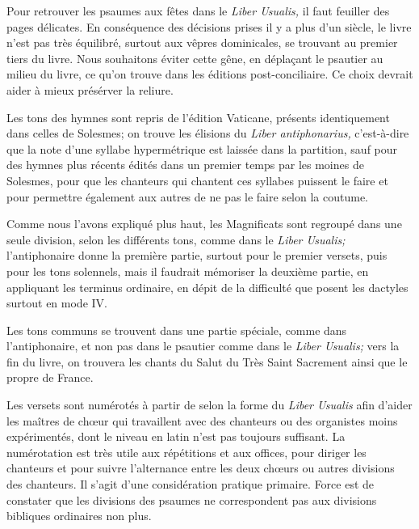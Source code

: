 \begin{frpars}
Pour retrouver les psaumes aux fêtes dans le \textit{Liber Usualis,} il faut feuiller des pages délicates. En conséquence des décisions prises il y a plus d'un siècle, le livre n'est pas très équilibré, surtout aux vêpres dominicales, se trouvant au premier tiers du livre. Nous souhaitons éviter cette gêne, en déplaçant le psautier au milieu du livre, ce qu'on trouve dans les éditions post-conciliaire. Ce choix devrait aider à mieux présérver la reliure.

Les tons des hymnes sont repris de l'édition Vaticane, présents identiquement dans celles de Solesmes; on trouve les élisions du \textit{Liber antiphonarius,} c’est-à-dire que la note d'une syllabe hypermétrique est laissée dans la partition, sauf pour des hymnes plus récents édités dans un premier temps par les moines de Solesmes, pour que les chanteurs qui chantent ces syllabes puissent le faire et pour permettre également aux autres de ne pas le faire selon la coutume. 

Comme nous l'avons expliqué plus haut, les Magnificats sont regroupé dans une seule division, selon les différents tons, comme dans le \textit{Liber Usualis;} l'antiphonaire donne la première partie, surtout pour le premier versets, puis pour les tons solennels, mais il faudrait mémoriser la deuxième partie, en appliquant les terminus ordinaire, en dépit de la difficulté que posent les dactyles surtout en mode IV.

Les tons communs se trouvent dans une partie spéciale, comme dans l'antiphonaire, et non pas dans le psautier comme dans  le \textit{Liber Usualis;} vers la fin du livre, on trouvera les chants du Salut du Très Saint Sacrement ainsi que le propre de France.

Les versets sont numérotés à partir de  selon la forme du \textit{Liber Usualis} afin d'aider les maîtres de chœur qui travaillent avec des chanteurs ou des organistes moins expérimentés, dont le niveau en latin n'est pas toujours suffisant. La numérotation est très utile aux répétitions et aux offices, pour diriger les chanteurs et pour suivre l'alternance entre les deux chœurs ou autres divisions des chanteurs. Il s'agit d'une considération pratique primaire. Force est de constater que les divisions des psaumes ne correspondent pas aux divisions bibliques ordinaires non plus.
\end{frpars}
